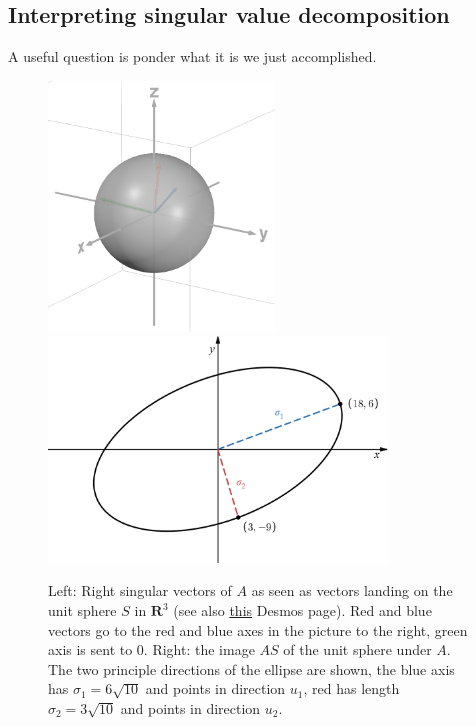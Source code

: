 \documentclass[12pt]{article}
\numberwithin{equation}{subsection}
\numberwithin{figure}{subsection}
\theoremstyle{note}
\newcommand{\R}{\mathbf{R}}
\begin{document}
\subsection{Interpreting singular value decomposition}
A useful question is ponder what it is we just accomplished.
\begin{figure}[h]
	\centering
	
	\includegraphics[width=60mm]{Images/S}  \qquad
	\includegraphics[width=90mm]{Images/AS}
\caption{Left: Right singular vectors of $A$ as seen as vectors landing on the unit sphere $S$ in $\R^3$ (see also \href{https://www.desmos.com/3d/rqqkklpdaj}{this} Desmos page). Red and blue vectors go to the red and blue axes in the picture to the right, green axis is sent to 0. 
Right: the image $AS$ of the unit sphere under $A$. The two principle directions of the ellipse are shown, the blue axis has $\sigma_1=6\sqrt{10}$ and points in direction $u_1$, red has length $\sigma_2=3\sqrt{10}$ and points in direction $u_2$.}
\label{fig:singval}
\end{figure}
\end{document}
